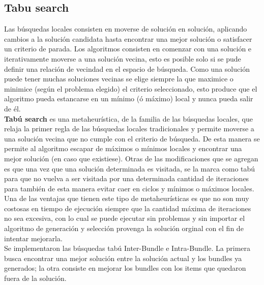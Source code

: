 \subsection{Tabu search}
Las búsquedas locales consisten en moverse de solución en solución, aplicando cambios a la solución candidata hasta encontrar una mejor solución o satisfacer un criterio de parada. Los algoritmos consisten en comenzar con una solución e iterativamente moverse a una solución vecina, esto es posible solo si se pude definir una relación de vecindad en el espacio de búsqueda. Como una solución puede tener muchas soluciones vecinas se elige siempre la que maximice o minimice (según el problema elegido) el criterio seleccionado, esto produce que el algoritmo pueda estancarse en un mínimo (ó máximo) local y nunca pueda salir de él.\\
\textbf{Tabú search} es una metaheurística, de la familia de las búsquedas locales, que relaja la primer regla de las búsquedas locales tradicionales y permite moverse a una solución vecina que no cumple con el criterio de búsqueda. De esta manera se permite al algoritmo escapar de máximos o mínimos locales y encontrar una mejor solución (en caso que existiese). Otras de las modificaciones que se agregan es que una vez que una solución determinada es visitada, se la marca como tabú para que no vuelva a ser visitada por una determinada cantidad de iteraciones para también de esta manera evitar caer en ciclos y mínimos o máximos locales.\\
Una de las ventajas que tienen este tipo de metaheurísticas es que no son muy costosas en tiempo de ejecución siempre que la cantidad máxima de iteraciones no sea excesiva, con lo cual se puede ejecutar sin problemas y sin importar el algoritmo de generación y selección provenga la solución orginal con el fin de intentar mejorarla.\\
Se implementaron las búsquedas tabú Inter-Bundle e Intra-Bundle. La primera busca encontrar una mejor solución entre la solución actual y los bundles ya generados; la otra consiste en mejorar los bundles con los items que quedaron fuera de la solución.

